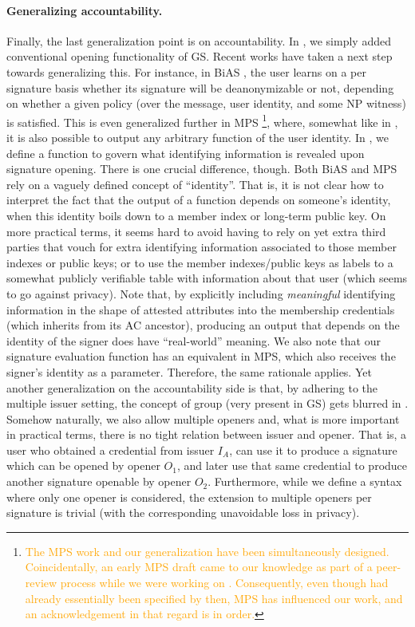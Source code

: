 \paragraph{Generalizing accountability.} %
Finally, the last generalization point is on accountability. In \GSAC, we simply
added conventional opening functionality of GS. Recent works have taken a next
step towards generalizing this. For instance, in BiAS \cite{lnpy21}, the user
learns on a per signature basis whether its signature will be deanonymizable or
not, depending on whether a given policy (over the message, user identity, and
some NP witness) is satisfied. This is even generalized further in MPS \needcite%
\footnote{\textcolor{orange}{The MPS work and our \UAS generalization have been
    simultaneously designed. Coincidentally, an early MPS draft came to our
    knowledge as part of a peer-review process while we were working on \UAS.
    Consequently, even though \UAS had already essentially been specified by
    then, MPS has influenced our work, and an acknowledgement in that regard is
    in order.}},
where, somewhat like in \UAS, it is also possible to output any arbitrary
function of the user identity. In \UAS, we define a function \finsp to govern
what identifying information is revealed upon signature opening. There is one
crucial difference, though. Both BiAS and MPS rely on a vaguely defined concept
of ``identity''. That is, it
is not clear how to interpret the fact that the output of a function depends
on someone's identity, when this identity boils down to a member index or
long-term public key. On more practical terms, it seems hard to avoid having
to rely on yet extra third parties that vouch for extra identifying information
associated to those member indexes or public keys; or to use the member
indexes/public keys as labels to a somewhat publicly verifiable table with
information about that user (which seems to go against privacy). Note that, by
explicitly including \emph{meaningful} identifying information in the shape of
attested attributes into the membership credentials (which \UAS inherits from
its AC ancestor), producing an output that depends on the identity of the
signer does have ``real-world'' meaning. We also note that our signature
evaluation function has an equivalent in MPS, which also receives the signer's
identity as a parameter. Therefore, the same rationale applies.
%
Yet another generalization on the accountability side is that, by adhering to
the multiple issuer setting, the concept of group (very present in GS) gets
blurred in \UAS. Somehow naturally, we also allow multiple openers and, what is
more important in practical terms, there is no tight relation between issuer
and opener. That is, a user who obtained a credential from issuer $I_A$, can use
it to produce a signature which can be opened by opener $O_1$, and later use
that same credential to produce another signature openable by opener $O_2$.
Furthermore, while we define a syntax where only one opener is considered, the
extension to multiple openers per signature is trivial (with the corresponding
unavoidable loss in privacy).


